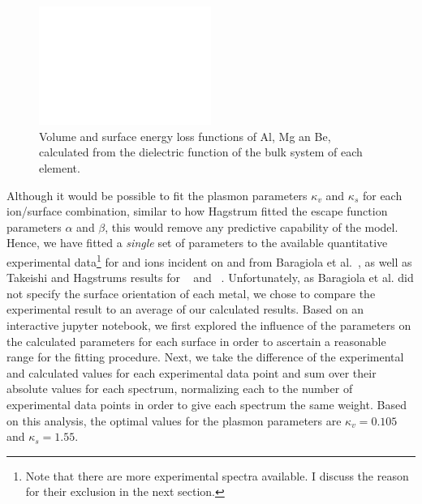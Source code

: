 \begin{refsection}
\begin{figure}[ht] 
\centering 
\includegraphics[width=0.5\textwidth]{./figures/quotas/energy_loss.eps} 
\caption{Volume and surface energy loss functions of Al, Mg an Be, calculated 
from the dielectric function of the bulk system of each element.} 
\label{quotas:fig-energy_loss} 
\end{figure} 

Although it would be possible to fit the plasmon parameters $\kappa_v$  and 
$\kappa_s$ for each ion/surface combination, similar to how Hagstrum fitted 
the escape function parameters $\alpha$ and $\beta$, this would remove any 
predictive capability of the model. Hence, we have fitted a \textit{single} 
set of parameters to the available quantitative experimental 
data\footnote{Note that there are more experimental spectra available. I 
discuss the reason for their exclusion in the next section.} for  and 
 ions incident on  and  from Baragiola et al.~\cite{Baragiola2001}, as well as 
Takeishi and Hagstrums results for ~\cite{Takeishi1965} and 
~\cite{Hagstrum1966}. Unfortunately, as Baragiola et al. did not 
specify the surface orientation of each metal, we chose to compare the experimental result 
to an average of our calculated results. Based on an interactive jupyter 
notebook, we first explored the influence of the parameters on the calculated 
parameters for each surface in order to ascertain a reasonable range for the 
fitting procedure. Next, we take the difference of the experimental and 
calculated values for each experimental data point and sum over their absolute values for each spectrum, 
normalizing each to the number of experimental data points in order to give 
each spectrum the same weight. Based on this analysis, the optimal values for 
the plasmon parameters are $\kappa_v = 0.105$ and $\kappa_s = 1.55$. 

 

\end{refsection}
